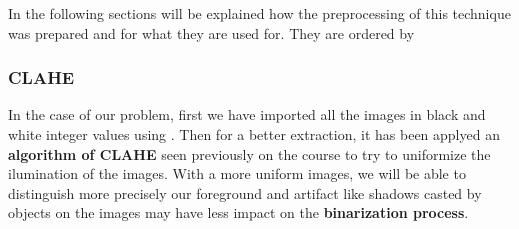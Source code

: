 \documentclass[11pt]{article}
\begin{document}
In the following sections will be explained how the preprocessing of this technique was prepared and for what they are used for. They are ordered by    

\subsubsection*{CLAHE}

In the case of our problem, first we have imported all the images in black and white integer values using . Then for a better extraction, it has been applyed an \textbf{algorithm of CLAHE} seen previously on the course to try to uniformize the ilumination of the images. With a more uniform images, we will be able to distinguish more precisely our foreground and artifact like shadows casted by objects on the images may have less impact on the \textbf{binarization process}.
\end{document}
